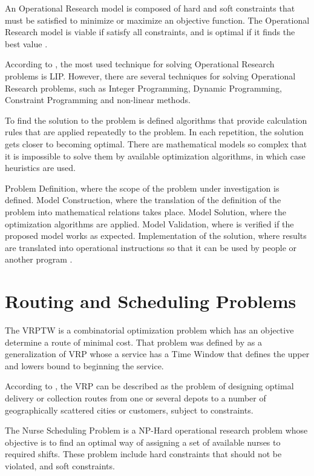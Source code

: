 An Operational Research model is composed of hard and soft constraints that must be satisfied to minimize or maximize an objective function.  The  Operational Research model is viable if satisfy all constraints, and is optimal if it finds the best value \cite{hamdy:2008}.

According to , the most used technique for solving Operational Research problems is \ac{LIP}. However, there are several techniques for solving Operational Research problems, such as Integer Programming, Dynamic Programming, Constraint Programming and non-linear methods.

To find the solution to the problem is defined algorithms that provide calculation rules that are applied repeatedly to the problem. In each repetition, the solution gets closer to becoming optimal. There are mathematical models so complex that it is impossible to solve them by available optimization algorithms, in which case heuristics are used\cite{hamdy:2008}.

 Problem Definition, where the scope of the problem under investigation is defined. Model Construction, where the translation of the definition of the problem into mathematical relations takes place. Model Solution, where the optimization algorithms are applied. Model Validation, where is verified if the proposed model works as expected. Implementation of the solution, where results are translated into operational instructions so that it can be used by people or another program \cite{hamdy:2008}.

\section{Routing and Scheduling Problems}

The \ac{VRPTW} is a combinatorial optimization problem which has an objective determine a route of minimal cost. That problem was defined by  as a generalization of \ac{VRP} whose a service has a Time Window that defines the upper and lowers bound to beginning the service.

According to \cite{laporte:1992}, the \ac{VRP} can be described as the problem of designing optimal delivery or collection routes from one or several depots to a number of geographically scattered cities or customers, subject to constraints.

The Nurse Scheduling Problem is a NP-Hard operational research problem whose objective is to find an optimal way of assigning a set of available nurses to required shifts. These problem include hard constraints that should not be violated, and soft constraints. \cite{santos:2015}

